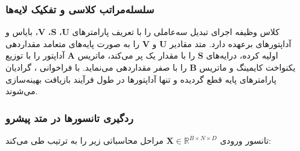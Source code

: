 \subsubsection*{سلسله‌مراتب کلاسی و تفکیک لایه‌ها}
کلاس  وظیفه اجرای تبدیل سه‌عاملی را با تعریف پارامترهای $\mathbf{U}$، $\mathbf{S}$، $\mathbf{V}$، بایاس و آداپتورهای  برعهده دارد. متد  مقادیر $\mathbf{U}$ و $\mathbf{V}$ را به صورت پایه‌های متعامد  مقداردهی اولیه کرده، درایه‌های $\mathbf{S}$ را با مقدار یک پر می‌کند، ماتریس $\mathbf{A}$ آداپتور  را با توزیع یکنواخت کایمینگ و ماتریس $\mathbf{B}$ را با صفر مقداردهی می‌نماید. با فراخوانی ، گرادیان پارامترهای پایه قطع گردیده و تنها آداپتورها در طول فرآیند بازیافت بهینه‌سازی می‌شوند.

\subsubsection*{ردگیری تانسورها در متد پیشرو }
تانسور ورودی $\mathbf{X} \in \mathbb{R}^{B \times N \times D}$ مراحل محاسباتی زیر را به ترتیب طی می‌کند:
